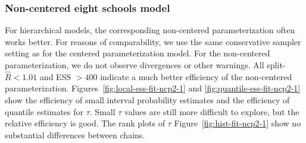 \documentclass[american,]{article}
\theoremstyle{definition}
\begin{document}
\hypertarget{non-centered-eight-schools-model}{%
\subsubsection*{Non-centered eight schools
model}\label{non-centered-eight-schools-model}}

For hierarchical models, the corresponding non-centered
parameterization often works better. For reasons of comparability, we use the 
same conservative sampler setting as for the centered parameterization model. 
For the non-centered parameterization, we do not observe divergences or 
other warnings.
All split-\(\widehat{R}<1.01\) and ESS \(>400\) indicate a much
better efficiency of the non-centered parameterization.
Figures~\ref{fig:local-ess-fit-ncp2-1} and
\ref{fig:quantile-ess-fit-ncp2-1} show the efficiency of small interval
probability estimates and the efficiency of quantile estimates for
$\tau$.
Small $\tau$ values are still more difficult to explore, but the relative 
efficiency is good. The rank plots of $\tau$ Figure~\ref{fig:hist-fit-ncp2-1} 
show no substantial differences between chains.
\end{document}
